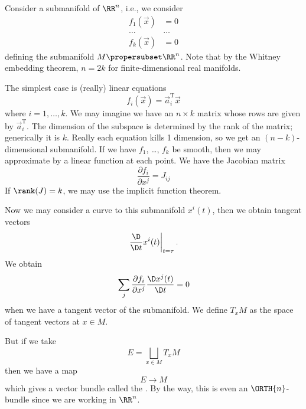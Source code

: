 \begin{ex}
Consider a submanifold of $\RR^{n}$, i.e., we consider 
\begin{subequations}
\begin{align}
f_{1}(\vec{x}) & = 0\\
\dots & \dots \\
f_{k}(\vec{x}) &= 0
\end{align}
\end{subequations}
defining the submanifold $M\propersubset\RR^{n}$. Note that by the  
Whitney embedding theorem, $n=2k$ for finite-dimensional real manifolds.

The simplest case is (really) linear equations
\begin{equation}
f_{i}(\vec{x})=\vec{a}_{i}^{\mathrm{T}}\vec{x}
\end{equation}
where $i=1,\dots,k$. We may imagine we have an $n\times k$ matrix
whose rows are given by $\vec{a}_{i}^{\mathrm{T}}$. The dimension
of the subspace is determined by the rank of the matrix;
generically it is $k$. Really each equation kills 1 dimension, so
we get an $(n-k)$-dimensional submanifold. If we have $f_{1}$,
\dots, $f_{k}$ be smooth, then we may approximate by a linear
function at each point. We have the Jacobian matrix
\begin{equation}
\frac{\partial f_{i}}{\partial x^{j}}=J_{ij}
\end{equation}
If $\rank(J)=k$, we may use the implicit function theorem. 

Now we may consider a curve to this submanifold $x^{i}(t)$, then
we obtain tangent vectors
\begin{equation}
\left.\frac{\D}{\D t}x^{i}(t)\right|_{t=\tau}.
\end{equation}
We obtain
\begin{equation}
\sum_{j}\frac{\partial f_{i}}{\partial x^{j}}\frac{\D
  x^{j}(t)}{\D t}=0
\end{equation}
when we have a tangent vector of the submanifold. We define
$T_{x}M$ as the space of tangent vectors at $x\in M$.

But if we take
\begin{equation}
E=\bigsqcup_{x\in M}T_{x}M
\end{equation}
then we have a map
\begin{equation}
E\to M
\end{equation}
which gives a vector bundle called the . By the way, this is even an $\ORTH{n}$-bundle since we
are working in $\RR^{n}$.


\end{ex}
